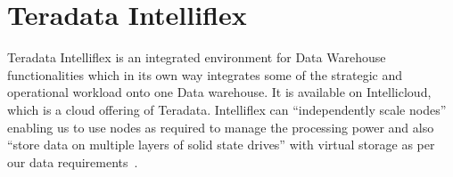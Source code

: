 \section{Teradata Intelliflex}

Teradata Intelliflex is an integrated environment for Data Warehouse 
functionalities which in its own way integrates some of the strategic and 
operational workload onto one Data warehouse. It is available on Intellicloud, 
which is a cloud offering of Teradata. Intelliflex can ``independently 
scale nodes'' enabling us to use nodes as required to manage the processing 
power and also ``store data on multiple layers of solid state drives'' with 
virtual storage as per our data
requirements~\cite{hid-sp18-418-Teradata-Intelliflex-features}. 
